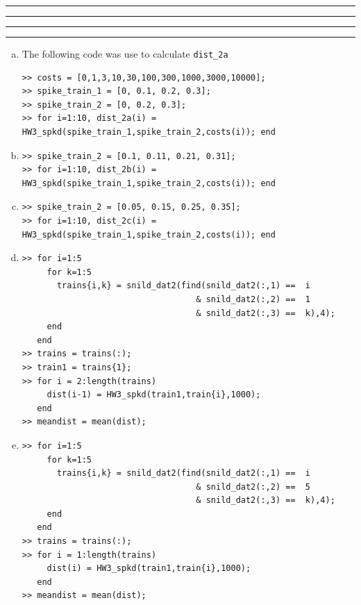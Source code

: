 \documentclass[11pt]{article}
\newcounter{questionCounter}
\newcounter{partCounter}[questionCounter]
\newenvironment{question}[2][\arabic{questionCounter}]{%
    \setcounter{partCounter}{0}%
    \vspace{.25in} \hrule \vspace{0.5em}%
        \noindent{\bf #2}%
    \vspace{0.8em} \hrule \vspace{.10in}%
    \addtocounter{questionCounter}{1}%
}{}
\begin{document}
\begin{question}{Problem 1}
\begin{enumerate}[a.]
\end{enumerate}
\end{question}

\begin{question}{Problem 2}
\begin{enumerate}[a.]
\item The following code was use to calculate \texttt{dist\_2a}
\begin{verbatim}
>> costs = [0,1,3,10,30,100,300,1000,3000,10000];                              
>> spike_train_1 = [0, 0.1, 0.2, 0.3];                                         
>> spike_train_2 = [0, 0.2, 0.3];     
>> for i=1:10, dist_2a(i) = HW3_spkd(spike_train_1,spike_train_2,costs(i)); end
\end{verbatim}

\item
\begin{verbatim}
>> spike_train_2 = [0.1, 0.11, 0.21, 0.31];
>> for i=1:10, dist_2b(i) = HW3_spkd(spike_train_1,spike_train_2,costs(i)); end
\end{verbatim}

\item
\begin{verbatim}
>> spike_train_2 = [0.05, 0.15, 0.25, 0.35];                                 
>> for i=1:10, dist_2c(i) = HW3_spkd(spike_train_1,spike_train_2,costs(i)); end
\end{verbatim}

\item
\begin{verbatim}
>> for i=1:5
     for k=1:5
       trains{i,k} = snild_dat2(find(snild_dat2(:,1) ==  i
                                   & snild_dat2(:,2) ==  1
                                   & snild_dat2(:,3) ==  k),4);
     end
   end
>> trains = trains(:);
>> train1 = trains{1};
>> for i = 2:length(trains)
     dist(i-1) = HW3_spkd(train1,train{i},1000);
   end
>> meandist = mean(dist);
\end{verbatim}

\newpage
\item
\begin{verbatim}
>> for i=1:5
     for k=1:5
       trains{i,k} = snild_dat2(find(snild_dat2(:,1) ==  i
                                   & snild_dat2(:,2) ==  5
                                   & snild_dat2(:,3) ==  k),4);
     end
   end
>> trains = trains(:);
>> for i = 1:length(trains)
     dist(i) = HW3_spkd(train1,train{i},1000);
   end
>> meandist = mean(dist);
\end{verbatim}


\end{enumerate}
\end{question}
\end{document}
